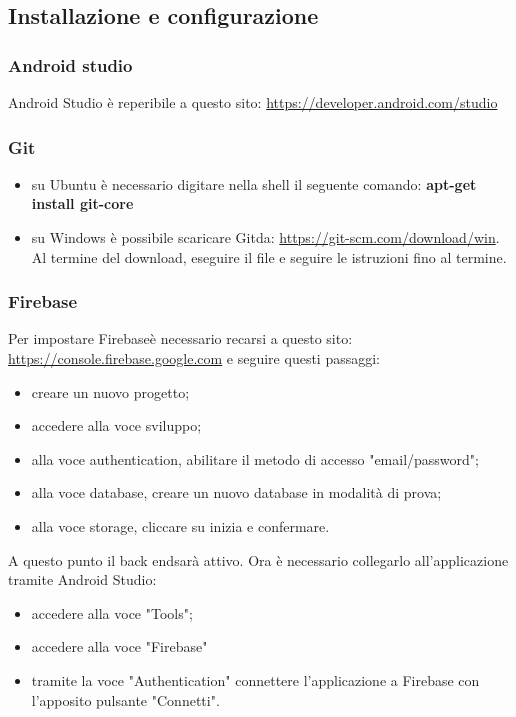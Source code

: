 \subsection{Installazione e configurazione}
\subsubsection{Android studio} 
Android Studio è reperibile a questo sito: \url{https://developer.android.com/studio}
\subsubsection{Git}
\begin{itemize}
	\item su Ubuntu è necessario digitare nella shell il seguente comando: \textbf{apt-get install git-core}
	\item su Windows è possibile scaricare Git\glosp da: \url{https://git-scm.com/download/win}.
	Al termine del download, eseguire il file e seguire le istruzioni fino al termine.
\end{itemize}
\subsubsection{Firebase}
Per impostare Firebase\glosp è necessario recarsi a questo sito: \url{https://console.firebase.google.com} e seguire questi passaggi:
\begin{itemize}
	\item creare un nuovo progetto;
	\item accedere alla voce sviluppo;
	\item alla voce authentication, abilitare il metodo di accesso "email/password";
	\item alla voce database, creare un nuovo database in modalità di prova;
	\item alla voce storage, cliccare su inizia e confermare.
\end{itemize}
A questo punto il back end\glosp sarà attivo. Ora è necessario collegarlo all'applicazione tramite Android Studio:
\begin{itemize}
	\item accedere alla voce "Tools";
	\item accedere alla voce "Firebase"
	\item tramite la voce "Authentication" connettere l'applicazione a Firebase con l'apposito pulsante "Connetti".
\end{itemize}
 

